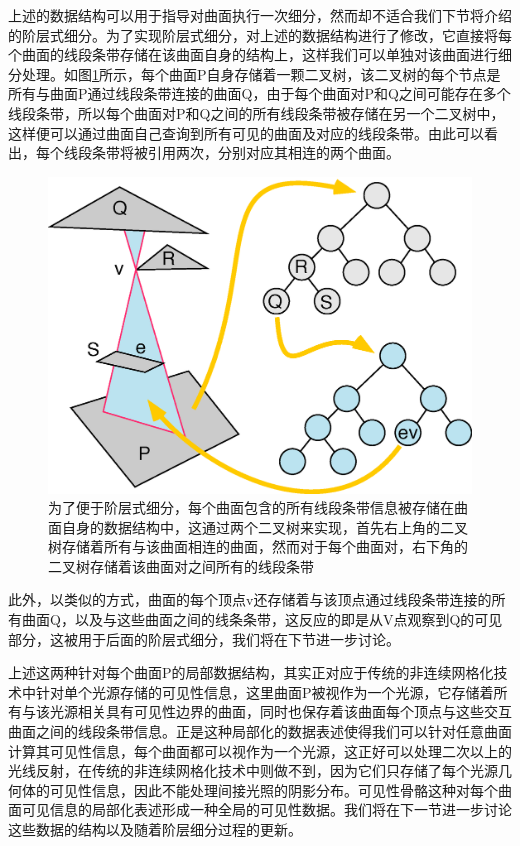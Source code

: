 上述的数据结构可以用于指导对曲面执行一次细分，然而却不适合我们下节将介绍的阶层式细分。为了实现阶层式细分，\cite{a:FastandAccurateHierarchicalRadiosityUsingGlobalVisibility}对上述的数据结构进行了修改，它直接将每个曲面的线段条带存储在该曲面自身的结构上，这样我们可以单独对该曲面进行细分处理。如图\ref{f:r-visibility-skeleton-structure}所示，每个曲面P自身存储着一颗二叉树，该二叉树的每个节点是所有与曲面P通过线段条带连接的曲面Q，由于每个曲面对P和Q之间可能存在多个线段条带，所以每个曲面对P和Q之间的所有线段条带被存储在另一个二叉树中，这样便可以通过曲面自己查询到所有可见的曲面及对应的线段条带。由此可以看出，每个线段条带将被引用两次，分别对应其相连的两个曲面。

\begin{figure}
\sidecaption
	\includegraphics[width=.55\textwidth]{figures/r/visibility-skeleton-structure}
	\caption{为了便于阶层式细分，每个曲面包含的所有线段条带信息被存储在曲面自身的数据结构中，这通过两个二叉树来实现，首先右上角的二叉树存储着所有与该曲面相连的曲面，然而对于每个曲面对，右下角的二叉树存储着该曲面对之间所有的线段条带}
	\label{f:r-visibility-skeleton-structure}
\end{figure}

此外，以类似的方式，曲面的每个顶点v还存储着与该顶点通过线段条带连接的所有曲面Q，以及与这些曲面之间的线条条带，这反应的即是从V点观察到Q的可见部分，这被用于后面的阶层式细分，我们将在下节进一步讨论。

上述这两种针对每个曲面P的局部数据结构，其实正对应于传统的非连续网格化技术中针对单个光源存储的可见性信息，这里曲面P被视作为一个光源，它存储着所有与该光源相关具有可见性边界的曲面，同时也保存着该曲面每个顶点与这些交互曲面之间的线段条带信息。正是这种局部化的数据表述使得我们可以针对任意曲面计算其可见性信息，每个曲面都可以视作为一个光源，这正好可以处理二次以上的光线反射，在传统的非连续网格化技术中则做不到，因为它们只存储了每个光源几何体的可见性信息，因此不能处理间接光照的阴影分布。可见性骨骼这种对每个曲面可见信息的局部化表述形成一种全局的可见性数据。我们将在下一节进一步讨论这些数据的结构以及随着阶层细分过程的更新。





